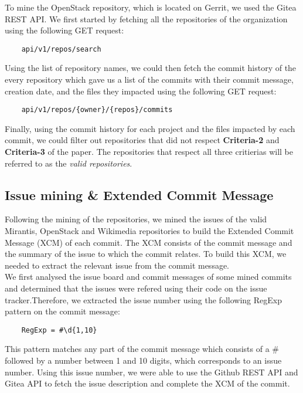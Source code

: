 To mine the OpenStack repository, which is located on Gerrit, we used the Gitea REST API. We first started by fetching all the repositories of the organization using the following GET request:

\begin{verbatim}
    api/v1/repos/search
\end{verbatim}

Using the list of repository names, we could then fetch the commit history of the every repository which gave us a list of the commits with their commit message, creation date, and the files they impacted using the following GET request:

\begin{verbatim}
    api/v1/repos/{owner}/{repos}/commits
\end{verbatim}

Finally, using the commit history for each project and the files impacted by each commit, we could filter out repositories that did not respect \textbf{Criteria-2} and \textbf{Criteria-3} of the paper. The repositories that respect all three critierias will be referred to as the \textit{valid repositories}.\\

\subsection{Issue mining \& Extended Commit Message}
Following the mining of the repositories, we mined the issues of the valid Mirantis, OpenStack and Wikimedia repositories to build the Extended Commit Message (XCM) of each commit. The XCM consists of the commit message and the summary of the issue to which the commit relates. To build this XCM, we needed to extract the relevant issue from the commit message. \\

We first analysed the issue board and commit messages of some mined commits and determined that the issues were refered using their code on the issue tracker.Therefore, we extracted the issue number using the following RegExp pattern on the commit message:

\begin{verbatim}
    RegExp = #\d{1,10}
\end{verbatim}

This pattern matches any part of the commit message which consists of a \# followed by a number between 1 and 10 digits, which corresponds to an issue number. Using this issue number, we were able to use the Github REST API and Gitea API to fetch the issue description and complete the XCM of the commit.\\

